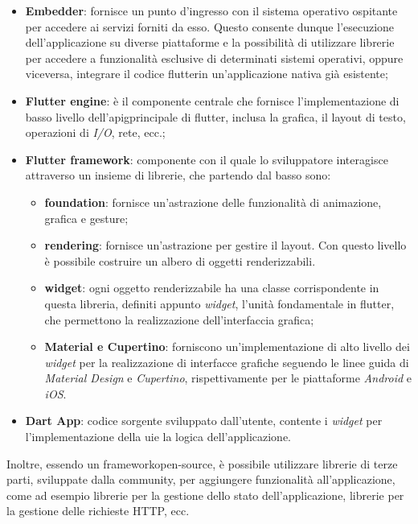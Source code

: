 \begin{itemize}
    \item \textbf{Embedder}: fornisce un punto d'ingresso con il sistema operativo ospitante per accedere ai servizi forniti da esso. Questo consente dunque l'esecuzione dell'applicazione su diverse piattaforme e la possibilità di utilizzare librerie per accedere a funzionalità esclusive di determinati sistemi operativi, oppure viceversa, integrare il codice \gls{flutter}\glsoccur in un'applicazione nativa già esistente;
    \item \textbf{Flutter engine}: è il componente centrale che fornisce l'implementazione di basso livello dell'\gls{apig}\glsoccur principale di \gls{flutter}\glsoccur, inclusa la grafica, il layout di testo, operazioni di \emph{I/O}, rete, ecc.;
    \item \textbf{Flutter framework}: componente con il quale lo sviluppatore interagisce attraverso un insieme di librerie, che partendo dal basso sono:
    \begin{itemize}
        \item \textbf{foundation}: fornisce un'astrazione delle funzionalità di animazione, grafica e \gls{gesture}\glsoccur;
        \item \textbf{rendering}: fornisce un'astrazione per gestire il layout. Con questo livello è possibile costruire un albero di oggetti renderizzabili.
        \item \textbf{widget}: ogni oggetto renderizzabile ha una classe corrispondente in questa libreria, definiti appunto \emph{widget}, l'unità fondamentale in \gls{flutter}\glsoccur, che permettono la realizzazione dell'interfaccia grafica;
        \item \textbf{Material e Cupertino}: forniscono un'implementazione di alto livello dei \emph{widget} per la realizzazione di interfacce grafiche seguendo le linee guida di \emph{Material Design} e \emph{Cupertino}, rispettivamente per le piattaforme \emph{Android} e \emph{iOS}.
    \end{itemize}
    \item \textbf{Dart App}: codice sorgente sviluppato dall'utente, contente i \emph{widget} per l'implementazione della \gls{ui}\glsoccur e la logica dell'applicazione.
\end{itemize}

Inoltre, essendo un \gls{framework}\glsoccur \gls{open-source}\glsoccur, è possibile utilizzare librerie di terze parti, sviluppate dalla community, per aggiungere funzionalità all'applicazione, come ad esempio librerie per la gestione dello stato dell'applicazione, librerie per la gestione delle richieste HTTP, ecc. \\

